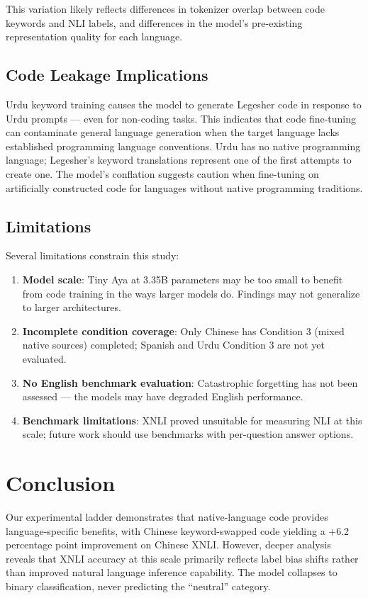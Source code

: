 \documentclass[conference]{IEEEtran}
\begin{document}
This variation likely reflects differences in tokenizer overlap between code keywords and NLI labels, and differences in the model's pre-existing representation quality for each language.

\subsection{Code Leakage Implications}
Urdu keyword training causes the model to generate Legesher code in response to Urdu prompts — even for non-coding tasks. This indicates that code fine-tuning can contaminate general language generation when the target language lacks established programming language conventions. Urdu has no native programming language; Legesher's keyword translations represent one of the first attempts to create one. The model's conflation suggests caution when fine-tuning on artificially constructed code for languages without native programming traditions.

\subsection{Limitations}
Several limitations constrain this study:
\begin{enumerate}
\item \textbf{Model scale}: Tiny Aya at 3.35B parameters may be too small to benefit from code training in the ways larger models do. Findings may not generalize to larger architectures.
\item \textbf{Incomplete condition coverage}: Only Chinese has Condition 3 (mixed native sources) completed; Spanish and Urdu Condition 3 are not yet evaluated.
\item \textbf{No English benchmark evaluation}: Catastrophic forgetting has not been assessed — the models may have degraded English performance.
\item \textbf{Benchmark limitations}: XNLI proved unsuitable for measuring NLI at this scale; future work should use benchmarks with per-question answer options.
\end{enumerate}

\section{Conclusion} 
\label{sec:conclusion}
Our experimental ladder demonstrates that native-language code provides language-specific benefits, with Chinese keyword-swapped code yielding a +6.2 percentage point improvement on Chinese XNLI. However, deeper analysis reveals that XNLI accuracy at this scale primarily reflects label bias shifts rather than improved natural language inference capability. The model collapses to binary classification, never predicting the ``neutral'' category.
\end{document}

